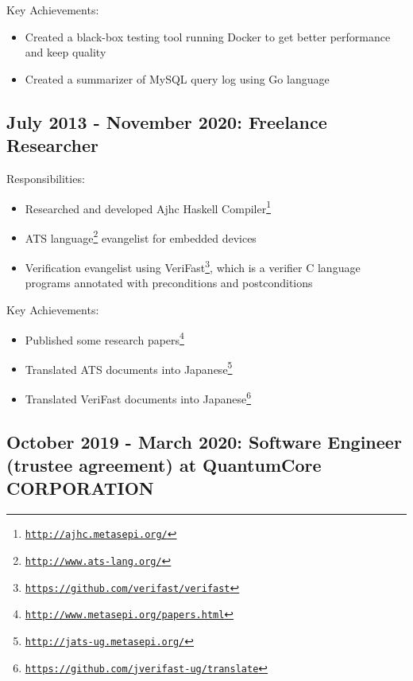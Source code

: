 \documentclass[letterpaper]{article}
\begin{document}
\noindent Key Achievements:

\begin{itemize}
  \item Created a black-box testing tool running Docker to get better performance and keep quality
  \item Created a summarizer of MySQL query log using Go language
\end{itemize}

\subsection*{July 2013 - November 2020: Freelance Researcher}

\noindent Responsibilities:

\begin{itemize}
  \item Researched and developed Ajhc Haskell Compiler\footnote{\href{http://ajhc.metasepi.org/}{\tt http://ajhc.metasepi.org/}}
  \item ATS language\footnote{\href{http://www.ats-lang.org/}{\tt http://www.ats-lang.org/}} evangelist for embedded devices
  \item Verification evangelist using VeriFast\footnote{\href{https://github.com/verifast/verifast}{\tt https://github.com/verifast/verifast}}, which is a verifier C language programs annotated with preconditions and postconditions
\end{itemize}

\noindent Key Achievements:

\begin{itemize}
  \item Published some research papers\footnote{\href{http://www.metasepi.org/papers.html}{\tt http://www.metasepi.org/papers.html}}
  \item Translated ATS documents into Japanese\footnote{\href{http://jats-ug.metasepi.org/}{\tt http://jats-ug.metasepi.org/}}
  \item Translated VeriFast documents into Japanese\footnote{\href{https://github.com/jverifast-ug/translate}{\tt https://github.com/jverifast-ug/translate}}
\end{itemize}

\subsection*{October 2019 - March 2020: Software Engineer (trustee agreement) at QuantumCore CORPORATION}
\end{document}
